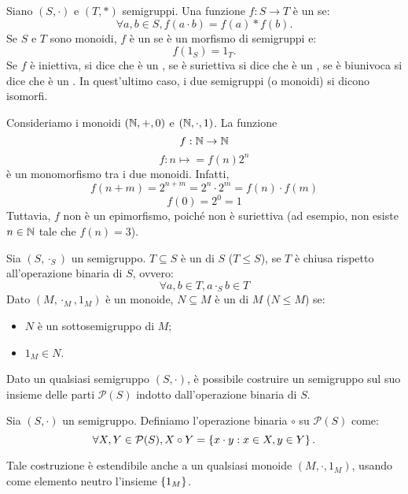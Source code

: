 \begin{definition}
  Siano \((S,\cdot)\) e \((T,*)\) semigruppi.
  Una funzione \(f: S \to T\) è un  se:
  \[\forall a,b \in S, f(a \cdot b) = f(a) * f(b).\]
  Se \(S\) e \(T\) sono monoidi, \(f\) è un  se è un morfismo di semigruppi e:
  \[f(1_S) = 1_T.\]
  Se \(f\) è iniettiva, si dice che è un , se è suriettiva si dice che è un , se è biunivoca si dice che è un .
  In quest'ultimo caso, i due semigruppi (o monoidi) si dicono isomorfi.
\end{definition}
\begin{example}
  Consideriamo i monoidi \((\mathbb{N}, +, 0)\) e \((\mathbb{N}, \cdot, 1)\).
  La funzione 
  \[f: \mathbb{N} \to \mathbb{N}\]
  \[f:n \mapsto = f(n) 2^n\]
  è un monomorfismo tra i due monoidi.
  Infatti,
  \[f(n+m) = 2^{n+m} = 2^n \cdot 2^m = f(n) \cdot f(m)\]
  \[ f(0) = 2^0 = 1\]
  Tuttavia, \(f\) non è un epimorfismo, poiché non è suriettiva (ad esempio, non esiste \(n \in \mathbb{N}\) tale che \(f(n) = 3\)).
\end{example}

\begin{definition}
  Sia \((S,\cdot_S)\) un semigruppo.
  \(T \subseteq S\) è un  di \(S\) (\(T \leq S\)), se \(T\) è chiusa rispetto all'operazione binaria di \(S\), ovvero:
  \[\forall a,b \in T, a \cdot_S b \in T\]
  Dato \((M,\cdot_M,1_M)\) è un monoide, \(N \subseteq M\) è un  di \(M\) (\(N \leq M\)) se:
  \begin{itemize}
    \item \(N\) è un sottosemigruppo di \(M\);
    \item \(1_M \in N\).
  \end{itemize}
\end{definition}

Dato un qualsiasi semigruppo \((S,\cdot)\), è possibile costruire un semigruppo sul suo insieme delle parti \(\mathcal{P}(S)\) indotto dall'operazione binaria di \(S\).
\begin{definition}
  Sia \((S,\cdot)\) un semigruppo.
  Definiamo l'operazione binaria \(\circ\) su \(\mathcal{P}(S)\) come:
  \[\forall X,Y \in \mathcal{P}(S), X \circ Y = \set{x \cdot y : x \in X, y \in Y}.\]
\end{definition}
Tale costruzione è estendibile anche a un qualsiasi monoide \((M,\cdot,1_M)\), usando come elemento neutro l'insieme \(\set{1_M}\).

